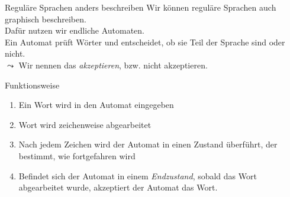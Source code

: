 \begin{frame}[fragile]{Reguläre Sprachen anders beschreiben}
    Wir können reguläre Sprachen auch graphisch beschreiben.\\
    Dafür nutzen wir \alert{endliche Automaten}.\\
    Ein Automat prüft Wörter und entscheidet, ob sie Teil der Sprache sind oder nicht.\\
    $\leadsto$ Wir nennen das \alert{\emph{akzeptieren}}, bzw. nicht akzeptieren.
    \begin{alertblock}{Funktionsweise}
        \begin{enumerate}
            \item Ein Wort wird in den Automat eingegeben
            \item Wort wird zeichenweise abgearbeitet
            \item Nach jedem Zeichen wird der Automat in einen Zustand überführt, der bestimmt, wie fortgefahren wird
            \item Befindet sich der Automat in einem \emph{Endzustand}, sobald das Wort abgearbeitet wurde, akzeptiert der Automat das Wort.
        \end{enumerate}
    \end{alertblock}
\end{frame}

